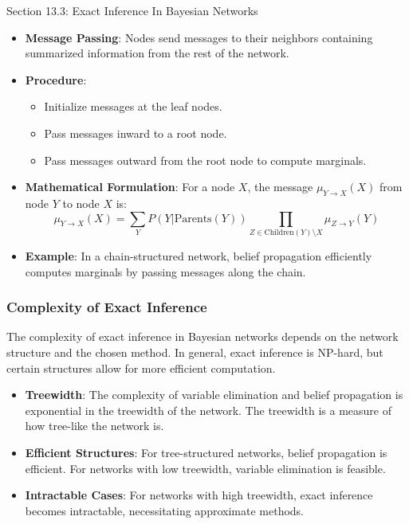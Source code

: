 \begin{notes}{Section 13.3: Exact Inference In Bayesian Networks}
\begin{highlight}
        \begin{itemize}
            \item \textbf{Message Passing}: Nodes send messages to their neighbors containing summarized information from the rest of the network.
            \item \textbf{Procedure}: 
                \begin{itemize}
                    \item Initialize messages at the leaf nodes.
                    \item Pass messages inward to a root node.
                    \item Pass messages outward from the root node to compute marginals.
                \end{itemize}
            \item \textbf{Mathematical Formulation}: For a node $X$, the message $\mu_{Y \to X}(X)$ from node $Y$ to node $X$ is:
            \[
            \mu_{Y \to X}(X) = \sum_{Y} P(Y | \text{Parents}(Y)) \prod_{Z \in \text{Children}(Y) \setminus X} \mu_{Z \to Y}(Y)
            \]
            \item \textbf{Example}: In a chain-structured network, belief propagation efficiently computes marginals by passing messages along the chain.
        \end{itemize}
    
    \end{highlight}
    
    \subsubsection*{Complexity of Exact Inference}
    
    The complexity of exact inference in Bayesian networks depends on the network structure and the chosen method. In general, exact inference is NP-hard, but certain structures allow for more efficient 
    computation.
    
    \begin{highlight}
    
        \begin{itemize}
            \item \textbf{Treewidth}: The complexity of variable elimination and belief propagation is exponential in the treewidth of the network. The treewidth is a measure of how tree-like the network is.
            \item \textbf{Efficient Structures}: For tree-structured networks, belief propagation is efficient. For networks with low treewidth, variable elimination is feasible.
            \item \textbf{Intractable Cases}: For networks with high treewidth, exact inference becomes intractable, necessitating approximate methods.
        \end{itemize}
    

\end{highlight}
\end{notes}
